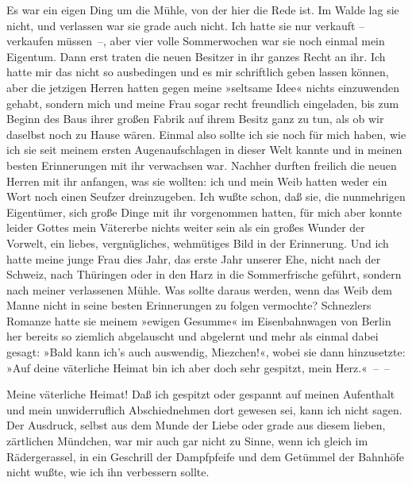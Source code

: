 Es war ein eigen Ding um die Mühle, von der hier die Rede ist. Im
Walde lag sie nicht, und verlassen war sie grade auch nicht. Ich
hatte sie nur verkauft – verkaufen müssen~–, aber vier volle
Sommerwochen war sie noch einmal mein Eigentum. Dann erst traten
die neuen Besitzer in ihr ganzes Recht an ihr. Ich hatte mir das
nicht so ausbedingen und es mir schriftlich geben lassen können,
aber die jetzigen Herren hatten gegen meine »seltsame Idee« nichts
einzuwenden gehabt, sondern mich und meine Frau sogar recht
freundlich eingeladen, bis zum Beginn des Baus ihrer großen Fabrik
auf ihrem Besitz ganz zu tun, als ob wir daselbst noch zu Hause
wären. Einmal also sollte ich sie noch für mich haben, wie ich sie
seit meinem ersten Augenaufschlagen in dieser Welt kannte und in
meinen besten Erinnerungen mit ihr verwachsen war. Nachher durften
freilich die neuen Herren mit ihr anfangen, was sie wollten: ich
und mein Weib hatten weder ein Wort noch einen Seufzer
dreinzugeben. Ich wußte schon, daß sie, die nunmehrigen Eigentümer,
sich große Dinge mit ihr vorgenommen hatten, für mich aber konnte
leider Gottes mein Vätererbe nichts weiter sein als ein großes
Wunder der Vorwelt, ein liebes, vergnügliches, wehmütiges Bild in
der Erinnerung. Und ich hatte meine junge Frau dies Jahr, das erste
Jahr unserer Ehe, nicht nach der Schweiz, nach Thüringen oder in
den Harz in die Sommerfrische geführt, sondern nach meiner
verlassenen Mühle. Was sollte daraus werden, wenn das Weib dem
Manne nicht in seine besten Erinnerungen zu folgen vermochte?
Schnezlers Romanze hatte sie meinem »ewigen Gesumme« im
Eisenbahnwagen von Berlin her bereits so ziemlich abgelauscht und
abgelernt und mehr als einmal dabei gesagt: »Bald kann ich's auch
auswendig, Miezchen!«, wobei sie dann hinzusetzte: »Auf deine
väterliche Heimat bin ich aber doch sehr gespitzt, mein Herz.«~–~–

Meine väterliche Heimat! Daß ich gespitzt oder gespannt auf meinen
Aufenthalt und mein unwiderruflich Abschiednehmen dort gewesen sei,
kann ich nicht sagen. Der Ausdruck, selbst aus dem Munde der Liebe
oder grade aus diesem lieben, zärtlichen Mündchen, war mir auch gar
nicht zu Sinne, wenn ich gleich im Rädergerassel, in ein Geschrill
der Dampfpfeife und dem Getümmel der Bahnhöfe nicht wußte, wie ich
ihn verbessern sollte.

